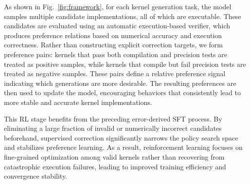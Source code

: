 As shown in Fig.~\ref{fig:framework}, for each kernel generation task, the model samples multiple candidate implementations, all of which are executable. These candidates are evaluated using an automatic execution-based verifier, which produces preference relations based on numerical accuracy and execution correctness. Rather than constructing explicit correction targets, we form preference pairs: kernels that pass both compilation and precision tests are treated as positive samples, while kernels that compile but fail precision tests are treated as negative samples. These pairs define a relative preference signal indicating which generations are more desirable. The resulting preferences are then used to update the model, encouraging behaviors that consistently lead to more stable and accurate kernel implementations.

This RL stage benefits from the preceding error-derived SFT process. By eliminating a large fraction of invalid or numerically incorrect candidates beforehand, supervised correction significantly narrows the policy search space and stabilizes preference learning. As a result, reinforcement learning focuses on fine-grained optimization among valid kernels rather than recovering from catastrophic execution failures, leading to improved training efficiency and convergence stability.
